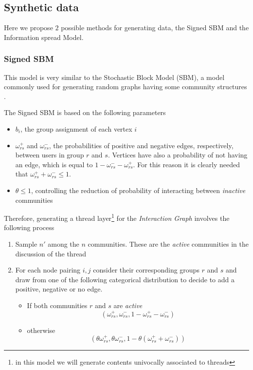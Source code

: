 \subsection{Synthetic data}%
\label{sub:synthetic_data}

Here we propose $2$ possible methods for generating data, the Signed SBM and
the Information spread Model.

\subsubsection{Signed SBM}%
\label{ssub:signed_sbm}

This model is very similar to the Stochastic Block Model (SBM), a model
commonly used for generating random graphs having some community structures
\cite{Newman2018}.

The Signed SBM is based on the following parameters
\begin{itemize}
	\item $b_{i} $, the group assignment of each vertex $i$
	\item $\omega ^{+} _{rs} $ and $\omega ^{-} _{rs} $, the probabilities
	      of positive and negative edges, respectively, between users in
	      group $r$ and $s$. Vertices have also a probability of not having an
	      edge, which is equal to $1 - \omega ^{-} _{rs} - \omega ^{+} _{rs} $.
	      For this reason it is clearly needed that $\omega ^{+} _{rs} + \omega ^{-} _{rs} \leq 1$.
	\item $\theta \leq 1$, controlling the reduction of probability of interacting
	      between \emph{inactive} communities
\end{itemize}

Therefore, generating a thread layer\footnote{in this model we will generate contents univocally associated to threads} for the \emph{Interaction Graph} involves the following process
\begin{enumerate}
	\item Sample $n'$ among the $n$ communities. These are the
	      \emph{active} communities in the discussion of the thread
	\item For each node pairing $i, j$ consider their corresponding groups $r$ and
	      $s$ and draw from one of the following categorical distribution to decide to add
	      a positive, negative or no edge.
	      \begin{itemize}
		      \item If both communities $r$ and $s$ are \emph{active}
		            \begin{equation*}
			            (\omega _{rs} ^{+}, \omega _{rs} ^{-}, 1 - \omega _{rs} ^{+} - \omega _{rs} ^{-})
		            \end{equation*}
		      \item otherwise
		            \begin{equation*}
			            (\theta \omega _{rs} ^{+}, \theta \omega _{rs} ^{-}, 1 - \theta (\omega _{rs} ^{+} + \omega _{rs} ^{-}))
		            \end{equation*}

	      \end{itemize}

\end{enumerate}

